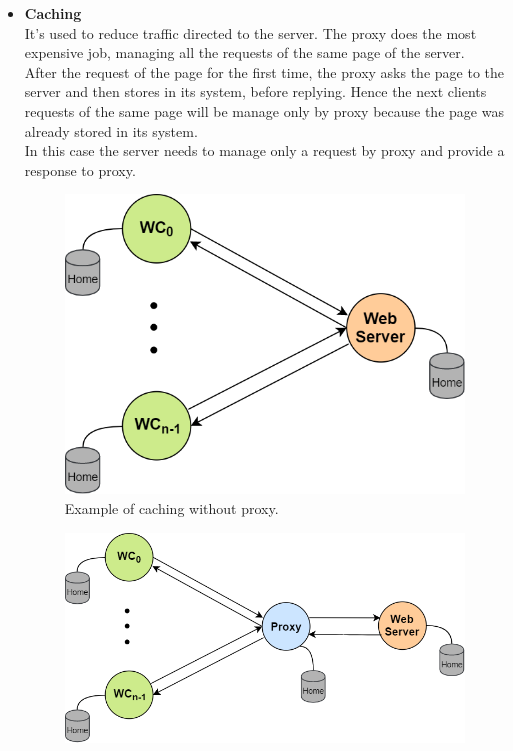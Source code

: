 \begin{itemize}
\item{\textbf{Caching}\\
It's used to reduce traffic directed to the server. The proxy does the most expensive job, managing all the requests of the same page of the server. \\
After the request of the page for the first time, the proxy asks the page to the server and then stores in its system, before replying. Hence the next clients requests of the same page will be manage only by proxy because the page was already stored in its system.\\
In this case the server needs to manage only a request by proxy and provide a response to proxy.
\begin{figure}[h]
\centering
\includegraphics[scale=0.38]{Images/Gateway/proxy_cache_no}
\caption{\footnotesize{Example of caching without proxy.}}\label{proxy_cache_no}
\end{figure}
\begin{figure}[h]
\centering
\includegraphics[scale=0.4]{Images/Gateway/proxy_cache}

\end{figure}}
\end{itemize}
